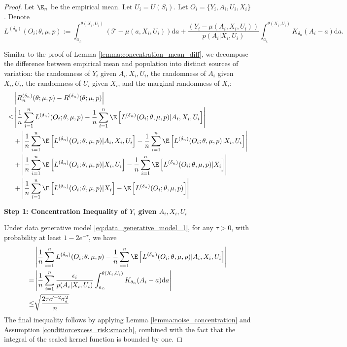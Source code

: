 \begin{proof}
Let $\E_n$ be the empirical mean. Let $U_i =U(S_i)$. Let $O_i=\{Y_i,A_i,U_i,X_i\}$. Denote $$L^{({\delta_n})}(O_i;\theta,\mu, p):=\int_{a_L}^{\theta(X_i,U_i)}(\mathcal{T}-\mu(a,X_i,U_i))\mathrm{d}a + \frac{(Y_i - \mu(A_i,X_i,U_i))}{ p(A_{i}|X_{i},U_{i})} \int_{a_L}^{\theta(X_i,U_i)}K_{\delta_n}(A_i-a)\mathrm{d}a.$$



Similar to the proof of Lemma \ref{lemma:concentration_mean_diff}, we decompose the difference between empirical mean and population into distinct sources of variation: the randomness of $Y_i$ given $A_i,X_i,U_i$, the randomness of $A_i$ given $X_i,U_i$, the randomness of $U_i$ given $X_i$, and the marginal randomness of $X_i$:
\begin{align*}
    &\left|R_n^{({\delta_n})}(\theta;\mu, p)-R^{({\delta_n})}(\theta;\mu, p)\right|\\
    \leq & \left|\frac{1}{n}\sum_{i=1}^n L^{({\delta_n})}(O_i;\theta,\mu, p)-\frac{1}{n}\sum_{i=1}^n\E\left[L^{({\delta_n})}(O_i;\theta,\mu, p)|A_i,X_i,U_i\right]\right|\\
    & + \left|\frac{1}{n}\sum_{i=1}^n\E\left[L^{({\delta_n})}(O_i;\theta,\mu, p)|A_i,X_i,U_i\right]-\frac{1}{n}\sum_{i=1}^n\E\left[L^{({\delta_n})}(O_i;\theta,\mu, p)|X_i,U_i\right]\right|\\
    & + \left|\frac{1}{n}\sum_{i=1}^n\E\left[L^{({\delta_n})}(O_i;\theta,\mu, p)|X_i,U_i\right]-\frac{1}{n}\sum_{i=1}^n\E\left[L^{({\delta_n})}(O_i;\theta,\mu, p)|X_i\right]\right|\\
    & + \left|\frac{1}{n}\sum_{i=1}^n\E\left[L^{({\delta_n})}(O_i;\theta,\mu, p)|X_i\right]-\E\left[L^{({\delta_n})}(O_i;\theta,\mu, p)\right]\right|
\end{align*}

\noindent \textbf{Step 1: Concentration Inequality of $Y_i$ given $A_i,X_i,U_i$}

\noindent Under data generative model \eqref{eq:data_generative_model_1},  for any $\tau > 0$, with probability at least $1 - 2e^{-\tau}$, we have 
\begin{align*}
    &\left|\frac{1}{n}\sum_{i=1}^n L^{({\delta_n})}(O_i;\theta,\mu, p)-\frac{1}{n}\sum_{i=1}^n\E\left[L^{({\delta_n})}(O_i;\theta,\mu, p)|A_i,X_i,U_i\right]\right|\\
    = & \left|\frac{1}{n}\sum_{i=1}^n \frac{\epsilon_i}{ p(A_{i}|X_{i},U_{i})} \int_{a_L}^{\theta(X_i,U_i)}K_{\delta_n}(A_i-a)\mathrm{d}a\right|\\
    \leq & \sqrt{\frac{2\tau c^{\prime-2} \sigma_\epsilon^2}{n}}
\end{align*}
The final inequality follows by applying Lemma \ref{lemma:noise_concentration} and Assumption \ref{condition:excess_risk:smooth}, combined with the fact that the integral of the scaled kernel function is bounded by one.


\end{proof}
